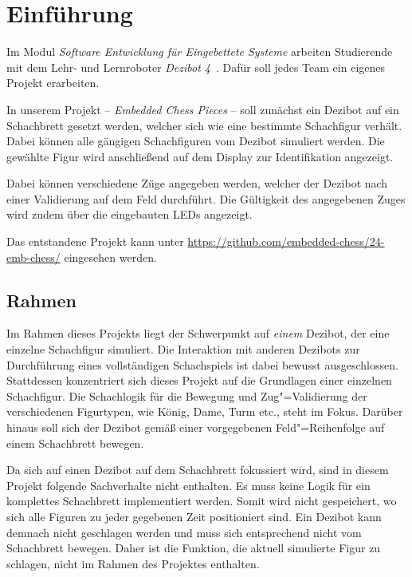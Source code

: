 
\section{Einführung}

Im Modul \emph{Software Entwicklung für Eingebettete Systeme} arbeiten Studierende mit dem Lehr- und Lernroboter \emph{Dezibot 4}~\cite{dezibotteamDezibotDezibot2025}. Dafür soll jedes Team ein eigenes Projekt erarbeiten.

In unserem Projekt -- \emph{Embedded Chess Pieces} -- soll zunächst ein Dezibot auf ein Schachbrett gesetzt werden, welcher sich wie eine bestimmte Schachfigur verhält. Dabei können alle gängigen Schachfiguren vom Dezibot simuliert werden. Die gewählte Figur wird anschließend auf dem Display zur Identifikation angezeigt.

Dabei können verschiedene Züge angegeben werden, welcher der Dezibot nach einer Validierung auf dem Feld durchführt. Die Gültigkeit des angegebenen Zuges wird zudem über die eingebauten LEDs angezeigt.

Das entstandene Projekt kann unter \url{https://github.com/embedded-chess/24-emb-chess/} eingesehen werden.


\subsection{Rahmen}

Im Rahmen dieses Projekts liegt der Schwerpunkt auf \emph{einem} Dezibot, der eine einzelne Schachfigur simuliert. Die Interaktion mit anderen Dezibots zur Durchführung eines vollständigen Schachspiels ist dabei bewusst ausgeschlossen. Stattdessen konzentriert sich dieses Projekt auf die Grundlagen einer einzelnen Schachfigur. Die Schachlogik für die Bewegung und Zug"=Validierung der verschiedenen Figurtypen, wie König, Dame, Turm etc., steht im Fokus. Darüber hinaus soll sich der Dezibot gemäß einer vorgegebenen Feld"=Reihenfolge auf einem Schachbrett bewegen.


Da sich auf einen Dezibot auf dem Schachbrett fokussiert wird, sind in diesem Projekt folgende Sachverhalte nicht enthalten. Es muss keine Logik für ein komplettes Schachbrett implementiert werden. Somit wird nicht gespeichert, wo sich alle Figuren zu jeder gegebenen Zeit positioniert sind. Ein Dezibot kann demnach nicht geschlagen werden und muss sich entsprechend nicht vom Schachbrett bewegen. Daher ist die Funktion, die aktuell simulierte Figur zu schlagen, nicht im Rahmen des Projektes enthalten.

